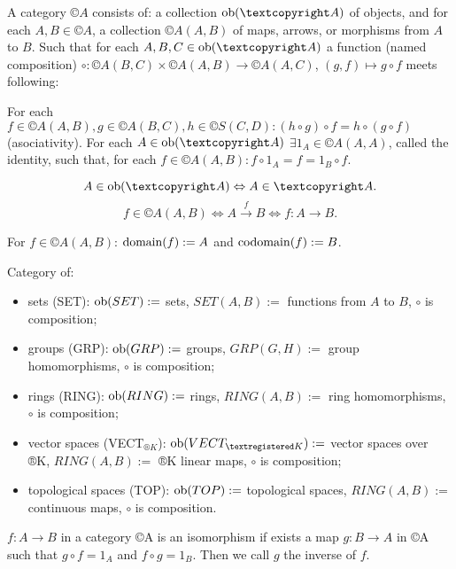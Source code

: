 \documentclass[12pt]{article}					%
\begin{document}

\begin{definice}
	A category $©A$ consists of: a collection $\ob(©A)$ of objects, and for each $A, B \in ©A$, a collection $©A(A, B)$ of maps, arrows, or morphisms from $A$ to $B$. Such that for each $A, B, C \in \ob(©A)$ a function (named composition) $∘: ©A(B, C) \times ©A(A, B) \rightarrow ©A(A, C)$, $(g, f) \mapsto g∘f$ meets following:

	For each $f \in ©A(A, B), g \in ©A(B, C), h \in ©S(C, D): (h ∘ g) ∘ f = h ∘ (g ∘ f)$ (asociativity). For each $A \in \ob(©A)$ $\exists 1_A \in ©A(A, A)$, called the identity, such that, for each $f \in ©A(A, B): f ∘ 1_A = f = 1_B ∘ f$.

	\begin{poznamka}[Notation]
		$$ A \in \ob(©A) \Leftrightarrow A \in ©A. $$
		$$ f \in ©A(A, B) \Leftrightarrow A \overset{f}\rightarrow B \Leftrightarrow f: A \rightarrow B. $$
	\end{poznamka}

	For $f \in ©A(A, B)$: $\operatorname{domain}(f) := A$ and $\operatorname{codomain}(f) := B$.
\end{definice}

\begin{priklady}[of categories]
	Category of:
	\begin{itemize}
		\item sets (SET): $\operatorname{ob}(SET) :=$ sets, $SET(A, B) :=$ functions from $A$ to $B$, $∘$ is composition;
		\item groups (GRP): $\operatorname{ob}(GRP) :=$ groups, $GRP(G, H) :=$ group homomorphisms, $∘$ is composition;
		\item rings (RING): $\operatorname{ob}(RING) :=$ rings, $RING(A, B) :=$ ring homomorphisms, $∘$ is composition;
		\item vector spaces (VECT$_{®K}$): $\ob(VECT_{®K}) :=$ vector spaces over ®K, $RING(A, B) :=$ ®K linear maps, $∘$ is composition;
		\item topological spaces (TOP): $\operatorname{ob}(TOP) :=$ topological spaces, $RING(A, B) :=$ continuous maps, $∘$ is composition.
	\end{itemize}
\end{priklady}

\begin{definice}
	$f: A \rightarrow B$ in a category ©A is an isomorphism if exists a map $g: B \rightarrow A$ in ©A such that $g ∘ f = 1_A$ and $f ∘ g = 1_B$. Then we call $g$ the inverse of $f$.
\end{definice}
\end{document}
